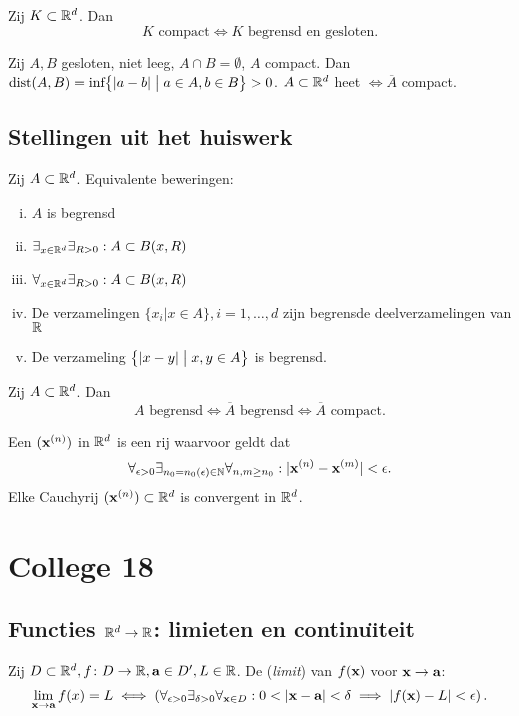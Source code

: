 \documentclass{2wa40summary}
\begin{document}
	Zij $K \subset \mathbb{R}^d$. Dan \[K \text{ compact}\iff K \text{ begrensd en gesloten.}\]
	
	\theorem Zij $A,B$ gesloten, niet leeg, $A\cap B = \emptyset$, $A$ compact.
	Dan $\text{dist}(A,B) = \text{inf}\big\{ |a-b| \bigm| a \in A, b \in B \big\} > 0$.
	 $A \subset \mathbb{R}^d$ heet  $\iff \overline{A}$ compact.
	
	\subsection{Stellingen uit het huiswerk}
	\theorem Zij $A \subset \mathbb{R}^d$. Equivalente beweringen:
	\begin{enumerate}[(i)]
		\item $A$ is begrensd
		\item $\exists _{x \in \mathbb{R}^d} \exists _{R>0}: A \subset B(x,R)$
		\item $\forall _{x \in \mathbb{R}^d} \exists _{R>0}: A \subset B(x,R)$
		\item De verzamelingen $\{ x_i | x \in A \}, i=1,\dots,d$ zijn begrensde deelverzamelingen van $\mathbb{R}$
		\item De verzameling $\big\{|x-y| \bigm| x,y \in A \big\}$ is begrensd.
	\end{enumerate}
	
	\theorem Zij $A \subset \mathbb{R}^d$. Dan \[A \text{ begrensd} \iff \overline{A} \text{ begrensd} \iff \overline{A}\text{ compact}.\]
	
	 Een  $({\textbf{x}}^{(n)})$ in $\mathbb{R}^d$ is een rij waarvoor geldt dat\[\forall _{\epsilon >0} \exists _{n_0=n_0(\epsilon )\in \naturals}\forall _{n,m \geq n_0}: |\x\up{n}-\x\up{m}| < \epsilon.\]
	\theorem Elke Cauchyrij $({\textbf{x}}^{(n)})\subset\mathbb{R}^d$ is convergent in $\mathbb{R}^d$.
	
	\newpage
	\section{College 18}
	\subsection{Functies $\mathbb{R}^d \to \mathbb{R}$: limieten en continu\"{\i}teit}
	 Zij $D \subset \mathbb{R}^d, f\colon D\to \mathbb{R}, {\textbf{a}} \in D', L\in\mathbb{R}$.
	De  (\textit{limit}) van $f({\textbf{x}})$ voor ${\textbf{x}}\to{\textbf{a}}$:
	\[ \lim_{\x\to \a}f(x)=L \iff \left( \forall _{\epsilon >0} \exists _{\delta >0} \forall _{\x \in D}: 0<|\x-\a|<\delta \implies |f(\x)-L|<\epsilon \right). \]
	
\end{document}
